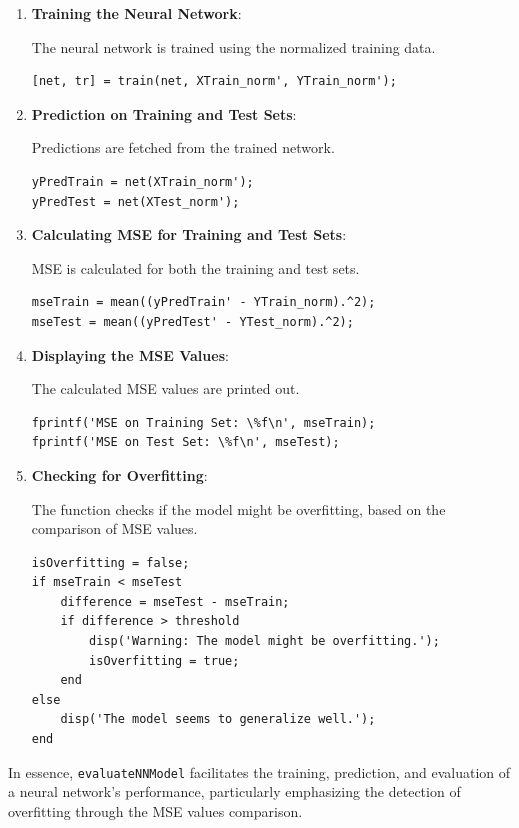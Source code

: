 \begin{enumerate}
    \item \textbf{Training the Neural Network}:
    
    The neural network is trained using the normalized training data.
    \begin{lstlisting}
[net, tr] = train(net, XTrain_norm', YTrain_norm');
    \end{lstlisting}
    
    \item \textbf{Prediction on Training and Test Sets}:
    
    Predictions are fetched from the trained network.
    \begin{lstlisting}
yPredTrain = net(XTrain_norm');
yPredTest = net(XTest_norm');
    \end{lstlisting}
    
    \item \textbf{Calculating MSE for Training and Test Sets}:
    
    MSE is calculated for both the training and test sets.
    \begin{lstlisting}
mseTrain = mean((yPredTrain' - YTrain_norm).^2);
mseTest = mean((yPredTest' - YTest_norm).^2);
    \end{lstlisting}
    
    \item \textbf{Displaying the MSE Values}:
    
    The calculated MSE values are printed out.
    \begin{lstlisting}
fprintf('MSE on Training Set: \%f\n', mseTrain);
fprintf('MSE on Test Set: \%f\n', mseTest);
    \end{lstlisting}
    
    \item \textbf{Checking for Overfitting}:
    
    The function checks if the model might be overfitting, based on the comparison of MSE values.
    \begin{lstlisting}
isOverfitting = false;
if mseTrain < mseTest
    difference = mseTest - mseTrain;
    if difference > threshold
        disp('Warning: The model might be overfitting.');
        isOverfitting = true;
    end
else
    disp('The model seems to generalize well.');
end
    \end{lstlisting}
\end{enumerate}

In essence, \texttt{evaluateNNModel} facilitates the training, prediction, and evaluation of a neural network's performance, particularly emphasizing the detection of overfitting through the MSE values comparison.


